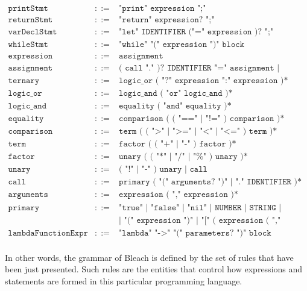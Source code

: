 {\[\begin{array}{rcl}
\texttt{printStmt} & ::= & \texttt{"print" expression ";"} \\[1pt]
\texttt{returnStmt} & ::= & \texttt{"return" expression? ";"} \\[1pt]
\texttt{varDeclStmt} & ::= & \texttt{"let" IDENTIFIER ("=" expression )? ";"} \\[1pt]
\texttt{whileStmt} & ::= & \texttt{"while" "(" expression ")" block} \\[1pt]
\texttt{expression} & ::= & \texttt{assignment} \\[1pt]
\texttt{assignment} & ::= & \texttt{( call "." )? IDENTIFIER "=" assignment | ternary} \\[1pt]
\texttt{ternary} & ::= & \texttt{logic\_or ( "?" expression ":" expression )*} \\[1pt]
\texttt{logic\_or} & ::= & \texttt{logic\_and ( "or" logic\_and )*} \\[1pt]
\texttt{logic\_and} & ::= & \texttt{equality ( "and" equality )*} \\[1pt]
\texttt{equality} & ::= & \texttt{comparison ( ( "==" | "!=" ) comparison )*} \\[1pt]
\texttt{comparison} & ::= & \texttt{term ( ( ">" | ">=" | "<" | "<=" ) term )*} \\[1pt]
\texttt{term} & ::= & \texttt{factor ( ( "+" | "-" ) factor )*} \\[1pt]
\texttt{factor} & ::= & \texttt{unary ( ( "*" | "/" | "\%" ) unary )*} \\[1pt]
\texttt{unary} & ::= & \texttt{( "!" | "-" ) unary | call} \\[1pt]
\texttt{call} & ::= & \texttt{primary ( "(" arguments? ")" | "." IDENTIFIER )*} \\[1pt]
\texttt{arguments} & ::= & \texttt{expression ( "," expression )*} \\[1pt]
\texttt{primary} & ::= & \texttt{"true" | "false" | "nil" | NUMBER | STRING | IDENTIFIER | "super" "." IDENTIFIER }  \\[1pt]
\texttt{} &  & \texttt{| "(" expression ")" | "[" ( expression ( "," expression )* )? "]"} \\[1pt]
\texttt{lambdaFunctionExpr} & ::= & \texttt{"lambda" "->"  "(" parameters? ")" block} \\[1pt]
\end{array}
\]
}

In other words, the grammar of Bleach is defined by the set of rules that have been just presented. Such rules are the entities that control how expressions and statements are formed in this particular programming language.

